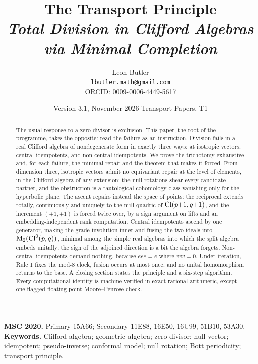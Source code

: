 \title{\bfseries The Transport Principle\\[4pt]
  \large\itshape Total Division in Clifford Algebras via Minimal Completion}
\author{Leon Butler\\ \normalsize\href{mailto:lbutler.math@gmail.com}{\texttt{lbutler.math@gmail.com}}\\ \normalsize ORCID: \href{https://orcid.org/0009-0006-4449-5617}{0009-0006-4449-5617}}
\date{Version 3.1, November 2026 \textperiodcentered{} Transport Papers, T1}


\maketitle

\begin{abstract}
\normalsize
The usual response to a zero divisor is exclusion. This paper, the root of the programme, takes the opposite: read the failure as an instruction. Division fails in a real Clifford algebra of nondegenerate form in exactly three ways: at isotropic vectors, central idempotents, and non-central idempotents. We prove the trichotomy exhaustive and, for each failure, the minimal repair and the theorem that makes it forced. From dimension three, isotropic vectors admit no equivariant repair at the level of elements, in the Clifford algebra of any extension: the null rotations shear every candidate partner, and the obstruction is a tautological cohomology class vanishing only for the hyperbolic plane. The ascent repairs instead the space of points: the reciprocal extends totally, continuously and uniquely to the null quadric of $\mathrm{Cl}(p{+}1,q{+}1)$, and the increment $(+1,+1)$ is forced twice over, by a sign argument on lifts and an embedding-independent rank computation. Central idempotents ascend by one generator, making the grade involution inner and fusing the two ideals into $\mathrm{M}_2(\mathrm{Cl}^0(p,q))$, minimal among the simple real algebras into which the split algebra embeds unitally; the sign of the adjoined direction is a bit the algebra forgets. Non-central idempotents demand nothing, because $eee = e$ where $vvv = 0$. Under iteration, Rule 1 fixes the mod-8 clock, fusion occurs at most once, and no unital homomorphism returns to the base. A closing section states the principle and a six-step algorithm. Every computational identity is machine-verified in exact rational arithmetic, except one flagged floating-point Moore--Penrose check.
\end{abstract}

\medskip
\noindent\textbf{MSC 2020.} Primary 15A66; Secondary 11E88, 16E50, 16U99, 51B10, 53A30.\\
\textbf{Keywords.} Clifford algebra; geometric algebra; zero divisor; null vector; idempotent; pseudo-inverse; conformal model; null rotation; Bott periodicity; transport principle.

